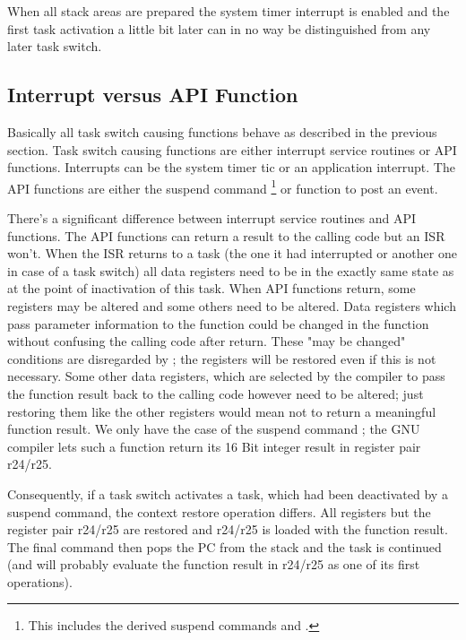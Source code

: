 When all stack areas are prepared the system timer interrupt is enabled
and the first task activation a little bit later can in no way be
distinguished from any later task switch.


\subsection{Interrupt versus API Function}
\label{secISRVsAPIFunc}

Basically all task switch causing functions behave as described in the
previous section. Task switch causing functions are either interrupt
service routines or API functions. Interrupts can be the system timer tic
or an application interrupt. The API functions are either the suspend
command \footnote{This includes the derived
suspend commands  and
.} or function  to
post an event.

There's a significant difference between interrupt service routines and
API functions. The API functions can return a result to the calling code
but an ISR won't. When the ISR returns to a task (the one it had
interrupted or another one in case of a task switch) all data registers
need to be in the exactly same state as at the point of inactivation of
this task. When API functions return, some registers may be altered and
some others need to be altered. Data registers which pass parameter
information to the function could be changed in the function without
confusing the calling code after return. These "may be changed" conditions
are disregarded by \rtos; the registers will be restored even if this is
not necessary. Some other data registers, which are selected by the
compiler to pass the function result back to the calling code however need
to be altered; just restoring them like the other registers would mean not
to return a meaningful function result. We only have the case of the
suspend command ; the GNU compiler
lets such a function return its 16 Bit integer result in register pair
r24/r25.

Consequently, if a task switch activates a task, which had been
deactivated by a suspend command, the context restore operation differs.
All registers but the register pair r24/r25 are restored and r24/r25 is
loaded with the function result. The final command  then pops
the PC from the stack and the task is continued (and will probably
evaluate the function result in r24/r25 as one of its first operations).

